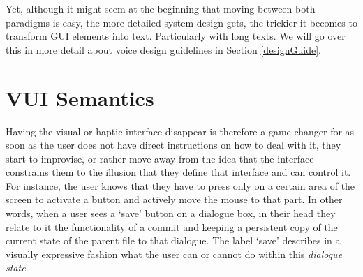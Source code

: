 Yet, although it might seem at the beginning that moving between both paradigms is easy, the more detailed system design gets, the trickier it becomes to transform GUI elements into text. Particularly with long texts. We will go over this in more detail about voice design guidelines in Section \ref{designGuide}.






\section{VUI Semantics}

Having the visual or haptic interface disappear is therefore a game changer for as soon as the user does not have direct instructions on how to deal with it, they start to improvise, or rather move away from the idea that the interface constrains them to the illusion that they define that interface and can control it. For instance, the user knows that they have to press only on a certain area of the screen to activate a button and actively move the mouse to that part. 
In other words,
when a user sees a  `save' button on a dialogue box, in their head they relate to it %
the functionality of %
a commit and keeping a persistent copy of the current state of the parent file to that dialogue. The label `save' describes in a visually expressive fashion what the user can or cannot do within this \textit{dialogue state}.


